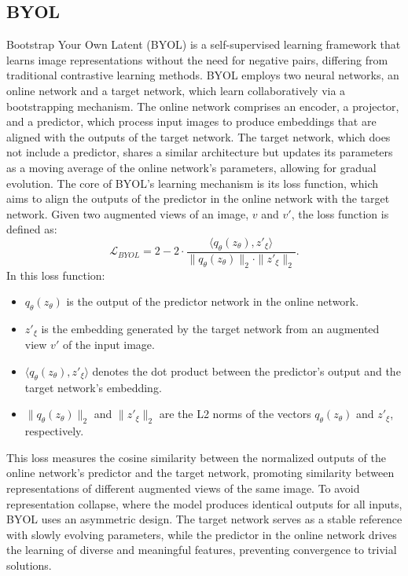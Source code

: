 \documentclass[peerreview]{IEEEtran}
\begin{document}
\subsection{BYOL}
Bootstrap Your Own Latent (BYOL) is a self-supervised learning framework that learns image representations without the need for negative pairs, differing from traditional contrastive learning methods. BYOL employs two neural networks, an online network and a target network, which learn collaboratively via a bootstrapping mechanism. The online network comprises an encoder, a projector, and a predictor, which process input images to produce embeddings that are aligned with the outputs of the target network. The target network, which does not include a predictor, shares a similar architecture but updates its parameters as a moving average of the online network's parameters, allowing for gradual evolution. The core of BYOL's learning mechanism is its loss function, which aims to align the outputs of the predictor in the online network with the target network. Given two augmented views of an image, $v$ and $v'$, the loss function is defined as:
\[
\mathcal{L}_{BYOL} = 2 - 2 \cdot \frac{\langle q_{\theta}(z_{\theta}), z'_{\xi} \rangle}{\|q_{\theta}(z_{\theta})\|_2 \cdot \|z'_{\xi}\|_2}.
\]
In this loss function:
\begin{itemize}
    \item $q_{\theta}(z_{\theta})$ is the output of the predictor network in the online network.
    \item $z'_{\xi}$ is the embedding generated by the target network from an augmented view $v'$ of the input image.
    \item $\langle q_{\theta}(z_{\theta}), z'_{\xi} \rangle$ denotes the dot product between the predictor's output and the target network's embedding.
    \item $\|q_{\theta}(z_{\theta})\|_2$ and $\|z'_{\xi}\|_2$ are the L2 norms of the vectors $q_{\theta}(z_{\theta})$ and $z'_{\xi}$, respectively.
\end{itemize}
This loss measures the cosine similarity between the normalized outputs of the online network's predictor and the target network, promoting similarity between representations of different augmented views of the same image. To avoid representation collapse, where the model produces identical outputs for all inputs, BYOL uses an asymmetric design. The target network serves as a stable reference with slowly evolving parameters, while the predictor in the online network drives the learning of diverse and meaningful features, preventing convergence to trivial solutions.
\end{document}
